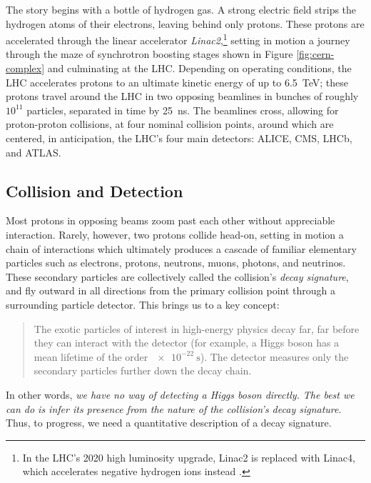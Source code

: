 \documentclass[11pt, a4paper]{article}
\begin{document}
The story begins with a bottle of hydrogen gas.
A strong electric field strips the hydrogen atoms of their electrons, leaving behind only protons.
These protons are accelerated through the linear accelerator \textit{Linac2},\footnote{In the LHC's 2020 high luminosity upgrade, Linac2 is replaced with Linac4, which accelerates negative hydrogen ions instead \cite{linac4-tdr}.} setting in motion a journey through the maze of synchrotron boosting stages shown in Figure \ref{fig:cern-complex} and culminating at the LHC.
Depending on operating conditions, the LHC accelerates protons to an ultimate kinetic energy of up to \SI{6.5}{\tera \electronvolt}; these protons travel around the LHC in two opposing beamlines in bunches of roughly $ 10^{11} $ particles, separated in time by \SI{25}{\nano \second}.
The beamlines cross, allowing for proton-proton collisions, at four nominal collision points, around which are centered, in anticipation, the LHC's four main detectors: ALICE, CMS, LHCb, and ATLAS.

\subsection{Collision and Detection}
Most protons in opposing beams zoom past each other without appreciable interaction.
Rarely, however, two protons collide head-on, setting in motion a chain of interactions which ultimately produces a cascade of familiar elementary particles such as electrons, protons, neutrons, muons, photons, and neutrinos.
These secondary particles are collectively called the collision's \textit{decay signature}, and fly outward in all directions from the primary collision point through a surrounding particle detector.
This brings us to a key concept:
\begin{quote}
    The exotic particles of interest in high-energy physics decay far, far before they can interact with the detector (for example, a Higgs boson has a mean lifetime of the order $ \SI[print-unity-mantissa = false]{e-22}{\second} $).
    The detector measures only the secondary particles further down the decay chain.
\end{quote}
In other words, \textit{we have no way of detecting a Higgs boson directly.
The best we can do is infer its presence from the nature of the collision's decay signature}.
Thus, to progress, we need a quantitative description of a decay signature.
\end{document}
